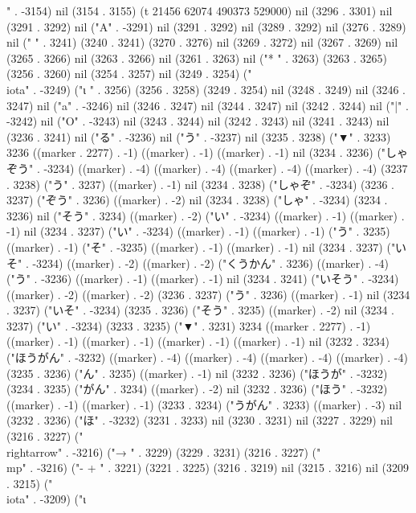 " . -3154) nil (3154 . 3155) (t 21456 62074 490373 529000) nil (3296 . 3301) nil (3291 . 3292) nil ("A" . -3291) nil (3291 . 3292) nil (3289 . 3292) nil (3276 . 3289) nil (" " . 3241) (3240 . 3241) (3270 . 3276) nil (3269 . 3272) nil (3267 . 3269) nil (3265 . 3266) nil (3263 . 3266) nil (3261 . 3263) nil ("*
" . 3263) (3263 . 3265) (3256 . 3260) nil (3254 . 3257) nil (3249 . 3254) ("\\iota" . -3249) ("ι
" . 3256) (3256 . 3258) (3249 . 3254) nil (3248 . 3249) nil (3246 . 3247) nil ("a" . -3246) nil (3246 . 3247) nil (3244 . 3247) nil (3242 . 3244) nil ("|" . -3242) nil ("O" . -3243) nil (3243 . 3244) nil (3242 . 3243) nil (3241 . 3243) nil (3236 . 3241) nil ("る" . -3236) nil ("う" . -3237) nil (3235 . 3238) ("▼" . 3233) 3236 ((marker . 2277) . -1) ((marker) . -1) ((marker) . -1) nil (3234 . 3236) ("しゃぞう" . -3234) ((marker) . -4) ((marker) . -4) ((marker) . -4) ((marker) . -4) (3237 . 3238) ("う" . 3237) ((marker) . -1) nil (3234 . 3238) ("しゃぞ" . -3234) (3236 . 3237) ("ぞう" . 3236) ((marker) . -2) nil (3234 . 3238) ("しゃ" . -3234) (3234 . 3236) nil ("そう" . 3234) ((marker) . -2) ("い" . -3234) ((marker) . -1) ((marker) . -1) nil (3234 . 3237) ("い" . -3234) ((marker) . -1) ((marker) . -1) ("う" . 3235) ((marker) . -1) ("そ" . -3235) ((marker) . -1) ((marker) . -1) nil (3234 . 3237) ("いそ" . -3234) ((marker) . -2) ((marker) . -2) ("くうかん" . 3236) ((marker) . -4) ("う" . -3236) ((marker) . -1) ((marker) . -1) nil (3234 . 3241) ("いそう" . -3234) ((marker) . -2) ((marker) . -2) (3236 . 3237) ("う" . 3236) ((marker) . -1) nil (3234 . 3237) ("いそ" . -3234) (3235 . 3236) ("そう" . 3235) ((marker) . -2) nil (3234 . 3237) ("い" . -3234) (3233 . 3235) ("▼" . 3231) 3234 ((marker . 2277) . -1) ((marker) . -1) ((marker) . -1) ((marker) . -1) ((marker) . -1) nil (3232 . 3234) ("ほうがん" . -3232) ((marker) . -4) ((marker) . -4) ((marker) . -4) ((marker) . -4) (3235 . 3236) ("ん" . 3235) ((marker) . -1) nil (3232 . 3236) ("ほうが" . -3232) (3234 . 3235) ("がん" . 3234) ((marker) . -2) nil (3232 . 3236) ("ほう" . -3232) ((marker) . -1) ((marker) . -1) (3233 . 3234) ("うがん" . 3233) ((marker) . -3) nil (3232 . 3236) ("ほ" . -3232) (3231 . 3233) nil (3230 . 3231) nil (3227 . 3229) nil (3216 . 3227) ("\\rightarrow" . -3216) ("→
" . 3229) (3229 . 3231) (3216 . 3227) ("\\mp" . -3216) ("-
+
" . 3221) (3221 . 3225) (3216 . 3219) nil (3215 . 3216) nil (3209 . 3215) ("\\iota" . -3209) ("ι
